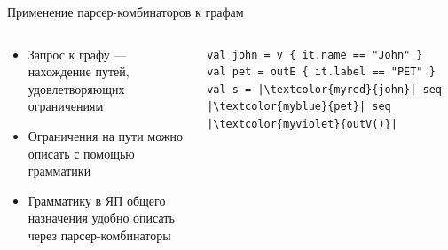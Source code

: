 \documentclass[aspectratio=169]{beamer}
\begin{document}
\begin{frame}[fragile]{Применение парсер-комбинаторов к графам}

  \begin{columns}[c]
    \begin{column}{0.45\textwidth}
      \begin{itemize}
        \item Запрос к графу --- нахождение путей, удовлетворяющих ограничениям
        \item Ограничения на пути можно описать с помощью грамматики
        \item Грамматику в ЯП общего назначения удобно описать через парсер-комбинаторы
      \end{itemize}
    \end{column}
    \begin{column}{0.58\textwidth}
      \begin{verbatim}
val john = v { it.name == "John" }
val pet = outE { it.label == "PET" }
val s = |\textcolor{myred}{john}| seq |\textcolor{myblue}{pet}| seq |\textcolor{myviolet}{outV()}|
\end{verbatim}

    \end{column}
  \end{columns}

\end{frame}

\end{document}
